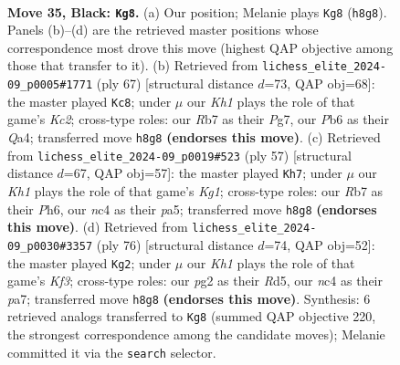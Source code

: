 \documentclass[11pt]{article}
\begin{document}
\clearpage

\begin{figure}[p]\centering
\begin{subfigure}{0.46\textwidth}\centering
\resizebox{\linewidth}{!}{%
\newchessgame
\chessboard[
  setfen={5r1k/1r5p/1p6/p7/2NQ3P/8/PP3PP1/R5K1 b - - 8 35},
  showmover=false,
  pgfstyle=straightmove, color=movearrow, markmove={h8-g8}
]}
\caption{}
\end{subfigure}\hfill
\begin{subfigure}{0.46\textwidth}\centering
\resizebox{\linewidth}{!}{%
\newchessgame
\chessboard[
  setfen={8/1pk3p1/2p5/2r3P1/q7/6QP/3PKP2/1R6 b - - 9 34},
  showmover=false,
  pgfstyle=straightmove, color=movearrow, markmove={c7-c8}
]}
\caption{}
\end{subfigure}
\\[4pt]
\begin{subfigure}{0.46\textwidth}\centering
\resizebox{\linewidth}{!}{%
\newchessgame
\chessboard[
  setfen={1Q4k1/p5p1/7p/P7/8/6P1/1Pqr1P1P/R5K1 b - - 2 29},
  showmover=false,
  pgfstyle=straightmove, color=movearrow, markmove={g8-h7}
]}
\caption{}
\end{subfigure}\hfill
\begin{subfigure}{0.46\textwidth}\centering
\resizebox{\linewidth}{!}{%
\newchessgame
\chessboard[
  setfen={8/p4ppk/1p3q2/3R3p/7P/P4KP1/1P1R4/8 w - - 2 39},
  showmover=false,
  pgfstyle=straightmove, color=movearrow, markmove={f3-g2}
]}
\caption{}
\end{subfigure}
\caption{\textbf{Move 35, Black: \texttt{Kg8}.} (a) Our position; Melanie plays \texttt{Kg8} (\texttt{h8g8}). Panels (b)--(d) are the retrieved master positions whose correspondence most drove this move (highest QAP objective among those that transfer to it). (b) Retrieved from \texttt{lichess\_elite\_2024-09\_p0005\#1771} (ply 67) [structural distance $d$=73, QAP obj=68]: the master played \texttt{Kc8}; under $\mu$ our \emph{Kh1} plays the role of that game's \emph{Kc2}; cross-type roles: our \emph{R}b7 as their \emph{P}g7, our \emph{P}b6 as their \emph{Q}a4; transferred move \texttt{h8g8} \textbf{(endorses this move)}. (c) Retrieved from \texttt{lichess\_elite\_2024-09\_p0019\#523} (ply 57) [structural distance $d$=67, QAP obj=57]: the master played \texttt{Kh7}; under $\mu$ our \emph{Kh1} plays the role of that game's \emph{Kg1}; cross-type roles: our \emph{R}b7 as their \emph{P}h6, our \emph{n}c4 as their \emph{p}a5; transferred move \texttt{h8g8} \textbf{(endorses this move)}. (d) Retrieved from \texttt{lichess\_elite\_2024-09\_p0030\#3357} (ply 76) [structural distance $d$=74, QAP obj=52]: the master played \texttt{Kg2}; under $\mu$ our \emph{Kh1} plays the role of that game's \emph{Kf3}; cross-type roles: our \emph{p}g2 as their \emph{R}d5, our \emph{n}c4 as their \emph{p}a7; transferred move \texttt{h8g8} \textbf{(endorses this move)}. Synthesis: 6 retrieved analogs transferred to \texttt{Kg8} (summed QAP objective 220, the strongest correspondence among the candidate moves); Melanie committed it via the \texttt{search} selector.}
\label{fig:thought-m69}
\end{figure}
\end{document}
